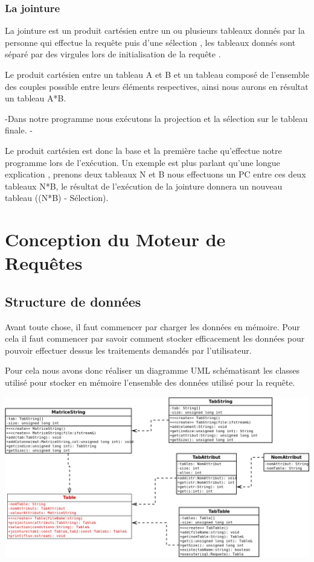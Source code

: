 \documentclass[oneside,13pt,a4paper]{report}
\begin{document}
        \subsection{La jointure}

            La jointure est un produit cartésien entre un ou plusieurs tableaux donnés par la personne qui effectue la requête puis d'une sélection , les tableaux donnés sont séparé par des virgules lors de initialisation de la requête .
	        
            Le produit cartésien entre un tableau A et B et un tableau composé de l'ensemble des couples possible entre leurs éléments respectives, ainsi nous aurons en résultat un tableau A*B.

            -Dans notre programme nous exécutons la projection et la sélection sur le tableau finale. -

	        Le produit cartésien est donc la base et la première tache qu’effectue notre programme lors de l’exécution. Un exemple est plus parlant qu'une longue explication , prenons deux tableaux N et B nous effectuons un PC entre ces deux tableaux N*B, le résultat de l’exécution de la jointure donnera un nouveau tableau ((N*B) - Sélection).


    \chapter{Conception du Moteur de Requêtes}

        \section{Structure de données}
            Avant toute chose, il faut commencer par charger les données en mémoire. Pour cela il faut commencer par savoir comment stocker efficacement les données pour pouvoir effectuer dessus les traitements demandés par l’utilisateur.

            Pour cela nous avons donc réaliser un diagramme UML schématisant les classes utilisé pour stocker en mémoire l’ensemble des données utilisé pour la requête.

            \includegraphics[width=1\textwidth]{img/sql.png}\par
\end{document}
